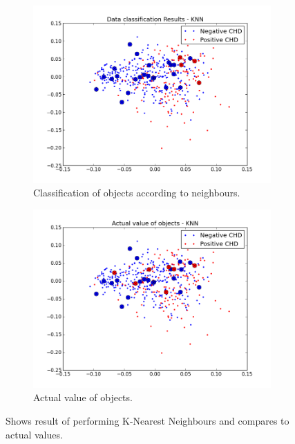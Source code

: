 \begin{figure}[H]
\begin{subfigure}[b]{0.5\textwidth}
\includegraphics[scale=0.3]{pictures/knnUsedResult.png}
\caption{Classification of objects according to neighbours.}
\label{knnUsedResult}
\end{subfigure}
	\begin{subfigure}[b]{0.5\textwidth}
\includegraphics[scale=0.3]{pictures/knnUsedActual.png}
\caption{Actual value of objects.}
\label{knnUsedResult}
	\end{subfigure}
\caption{Shows result of performing K-Nearest Neighbours and compares to actual values.}
\label{performKNN}
\end{figure}

